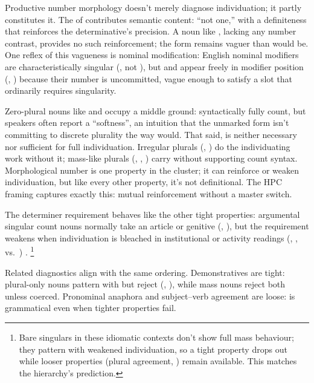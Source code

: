 \documentclass[12pt,a4paper]{article}
\begin{document}
Productive number morphology doesn't merely diagnose individuation; it partly constitutes it. The  of  contributes semantic content: \enquote{not one,} with a definiteness that reinforces the determinative's precision. A noun like , lacking any number contrast, provides no such reinforcement; the form remains vaguer than  would be. One reflex of this vagueness is nominal modification: English nominal modifiers are characteristically singular (, not ), but  and  appear freely in modifier position (, ) because their number is uncommitted, vague enough to satisfy a slot that ordinarily requires singularity.

Zero-plural nouns like  and  occupy a middle ground: syntactically fully count, but speakers often report a \enquote{softness}, an intuition that the unmarked form isn't committing to discrete plurality the way  would. That said,  is neither necessary nor sufficient for full individuation. Irregular plurals (, ) do the individuating work without it; mass-like plurals (, , ) carry  without supporting count syntax. Morphological number is one property in the cluster; it can reinforce or weaken individuation, but like every other property, it's not definitional. The HPC framing captures exactly this: mutual reinforcement without a master switch.

The determiner requirement behaves like the other tight properties: argumental singular count nouns normally take an article or genitive (, ), but the requirement weakens when individuation is bleached in institutional or activity readings (, ,  vs.\ ) \citep[pp.~409--410]{huddleston2002}.%
\footnote{Bare singulars in these idiomatic contexts don't show full mass behaviour; they pattern with weakened individuation, so a tight property drops out while looser properties (plural agreement, ) remain available. This matches the hierarchy's prediction.}

Related diagnostics align with the same ordering. Demonstratives are tight: plural-only nouns pattern with  but reject  (, ), while mass nouns reject both unless coerced. Pronominal anaphora and subject--verb agreement are loose:  is grammatical even when tighter properties fail.
\end{document}
